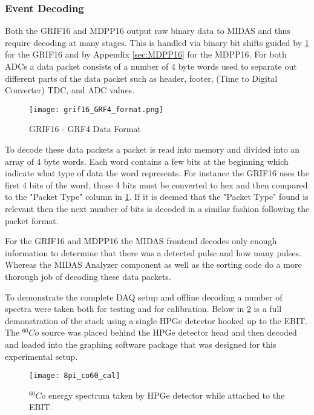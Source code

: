 \documentclass[jon_ringuette_thesis_proposal.tex]{subfiles}
\begin{document}
    \subsubsection{Event Decoding}
    Both the GRIF16 and MDPP16 output raw binary data to MIDAS and thus require decoding at many stages.
    This is handled via binary bit shifts guided by \ref{fig:GRIF16_GRF4} for the GRIF16 and by Appendix \ref{sec:MDPP16} for the MDPP16.
    For both ADCs a data packet consists of a number of 4 byte words used to separate out different parts of the data packet such as header, footer, (Time to Digital Converter) TDC, and ADC values.

    \begin{figure}[H]
        \texttt{[image: grif16\_GRF4\_format.png]}
        \caption{\small GRIF16 - GRF4 Data Format \cite{GRIF16_format_November2015}}
        \label{fig:GRIF16_GRF4}
    \end{figure}


    To decode these data packets a packet is read into memory and divided into an array of 4 byte words.
    Each word contains a few bits at the beginning which indicate what type of data the word represents.
    For instance the GRIF16 uses the first 4 bits of the word, those 4 bits must be converted to hex and then compared to the "Packet Type" column in \ref{fig:GRIF16_GRF4}.
    If it is deemed that the "Packet Type" found is relevant then the next number of bits is decoded in a similar fashion following the packet format.

    For the GRIF16 and MDPP16 the MIDAS frontend decodes only enough information to determine that there was a detected pulse and how many pulses.
    Whereas the MIDAS Analyzer component as well as the sorting code do a more thorough job of decoding these data packets.

    To demonstrate the complete DAQ setup and offline decoding a number of spectra were taken both for testing and for calibration.  Below in \ref{fig:hpge_calibration_co60} is a full demonstration of the stack using a single HPGe detector hooked up to the EBIT.  The $^{60}Co$ source was placed behind the HPGe detector head and then decoded and loaded into the graphing software package that was designed for this experimental setup.
    \begin{figure}[H]
        \centering
        \begin{mdframed}[backgroundcolor=black!80]
            \texttt{[image: 8pi\_co60\_cal]}
        \end{mdframed}
        \caption{$^{60}Co$ energy spectrum taken by HPGe detector while attached to the EBIT.}
        \label{fig:hpge_calibration_co60}
    \end{figure}
\end{document}
